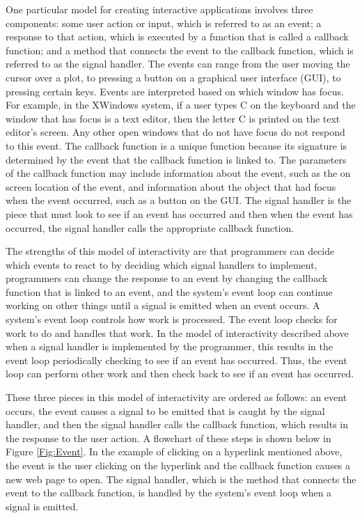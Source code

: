 \documentclass{article}[11pt]
\begin{document}
One particular model for creating interactive applications involves three
components: some user action or input, which is referred to as an event;
a response to that action, which is executed by a function that is called
a callback function; and a method that connects the event to the callback
function, which is referred to as the signal handler.  The events can
range from the user moving the cursor over a plot, to pressing a button on a
graphical user interface (GUI), to pressing certain keys.  Events are
interpreted based on which window has focus.  For example, in the XWindows
system, if a user types C on the keyboard and the window that has focus is a
text editor, then the letter C is printed on the text editor's screen.
Any other open windows that do not have
focus do not respond to this event.  The callback function is a unique
function because its signature is determined by the event that the callback
function is linked to.  The parameters of the callback function may include
information about the event, such as the on screen location of the event, and
information about the object that had focus when the event occurred, such as a
button on the GUI.  The signal handler is the piece that must look to see if
an event has occurred and then when the event has occurred, the signal handler
calls the appropriate callback function.  

The strengths of this model of interactivity are that programmers can decide
which events to react to by deciding which signal handlers to implement,
programmers can change the response to an event by changing the callback
function that is linked to an event, and the system's event loop can continue
working on other things until a signal is emitted when an event occurs.  A
system's event loop controls how work is processed.  The event loop checks for
work to do and handles that work.  In the model of interactivity described
above when a signal handler is implemented by the programmer, this results in
the event loop periodically checking to see if an event has occurred.  Thus,
the event loop can perform other work and then check back to see if an event
has occurred.

These three pieces in this model of interactivity are ordered as follows:
an event occurs, the event causes a signal to be emitted that is caught by the
signal handler, and then the signal handler calls the callback function, which
results in the response to the user action.  A flowchart of these steps is
shown below in Figure \ref{Fig:Event}.  In the example of clicking on a
hyperlink mentioned above, the event is the user clicking on the
hyperlink and the callback function causes a new web page to open.
The signal handler, which is the method that connects the event to the
callback function, is handled by the system's event loop when a signal is
emitted. 
\end{document}
